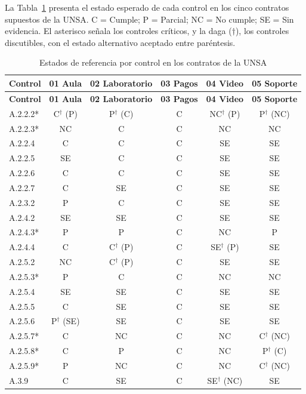 \documentclass[12pt,letterpaper]{article}
\begin{document}
La Tabla~\ref{tab:unsa-matriz} presenta el estado esperado de cada control en los cinco contratos supuestos de la UNSA. C = Cumple; P = Parcial; NC = No cumple; SE = Sin evidencia. El asterisco señala los controles críticos, y la daga ($\dagger$), los controles discutibles, con el estado alternativo aceptado entre paréntesis.

\begin{small}
\begin{longtable}{@{}l c c c c c@{}}
\caption{Estados de referencia por control en los contratos de la UNSA}\label{tab:unsa-matriz}\\
\toprule
\textbf{Control} & \textbf{01 Aula} & \textbf{02 Laboratorio} & \textbf{03 Pagos} & \textbf{04 Video} & \textbf{05 Soporte} \\
\midrule
\endfirsthead
\toprule
\textbf{Control} & \textbf{01 Aula} & \textbf{02 Laboratorio} & \textbf{03 Pagos} & \textbf{04 Video} & \textbf{05 Soporte} \\
\midrule
\endhead
\bottomrule
\endfoot
A.2.2.2* & C$^\dagger$ (P) & P$^\dagger$ (C) & C & NC$^\dagger$ (P) & P$^\dagger$ (NC) \\
A.2.2.3* & NC & C & C & NC & NC \\
A.2.2.4 & C & C & C & SE & SE \\
A.2.2.5 & SE & C & C & SE & SE \\
A.2.2.6 & C & C & C & SE & SE \\
A.2.2.7 & C & SE & C & SE & SE \\
A.2.3.2 & P & C & C & SE & SE \\
A.2.4.2 & SE & SE & C & SE & SE \\
A.2.4.3* & P & P & C & NC & P \\
A.2.4.4 & C & C$^\dagger$ (P) & C & SE$^\dagger$ (P) & SE \\
A.2.5.2 & NC & C$^\dagger$ (P) & C & SE & SE \\
A.2.5.3* & P & C & C & NC & NC \\
A.2.5.4 & SE & SE & C & SE & SE \\
A.2.5.5 & C & SE & C & SE & SE \\
A.2.5.6 & P$^\dagger$ (SE) & SE & C & SE & SE \\
A.2.5.7* & C & NC & C & NC & C$^\dagger$ (NC) \\
A.2.5.8* & C & P & C & NC & P$^\dagger$ (C) \\
A.2.5.9* & P & NC & C & NC & C$^\dagger$ (NC) \\
A.3.9 & C & SE & C & SE$^\dagger$ (NC) & SE \\

\end{longtable}
\end{small}
\end{document}
